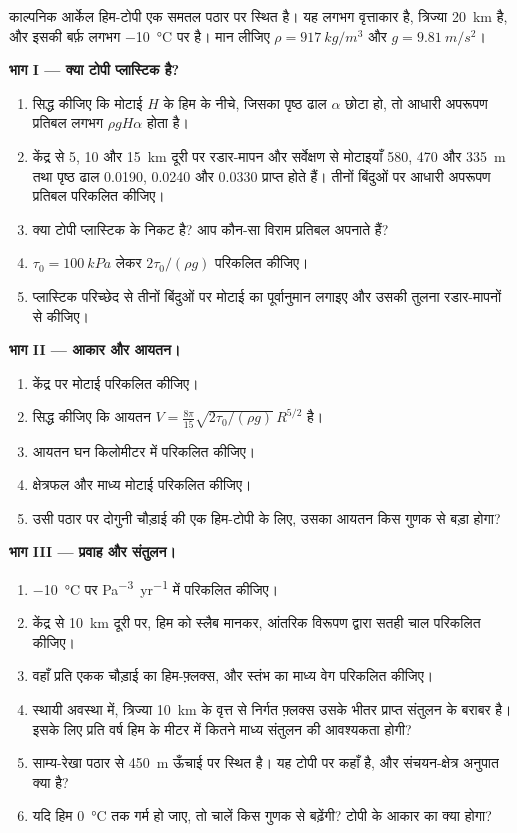 \begin{problem}[{सप्ताहांत समस्या --- आकार, प्रवाह, संतुलन और
काल्पनिक हिम-टोपी का समुद्र-तल तुल्यांक}]
\label{pb:b3:glaciology:1}
काल्पनिक आर्केल हिम-टोपी एक समतल पठार पर स्थित है। यह लगभग वृत्ताकार है,
त्रिज्या \qty{20}{km} है, और इसकी बर्फ़ लगभग \qty{-10}{\celsius} पर है। मान लीजिए
$\rho = \qty{917}{kg/m^3}$ और $g = \qty{9.81}{m/s^2}$।

\medskip\noindent\textbf{भाग I --- क्या टोपी प्लास्टिक है?}
\begin{enumerate}
\item सिद्ध कीजिए कि मोटाई $H$ के हिम के नीचे, जिसका पृष्ठ ढाल
  $\alpha$ छोटा हो, तो आधारी अपरूपण प्रतिबल लगभग $\rho gH\alpha$ होता है।
\item केंद्र से 5, 10 और \qty{15}{km} दूरी पर रडार-मापन और सर्वेक्षण
  से मोटाइयाँ 580, 470 और \qty{335}{m} तथा पृष्ठ ढाल
  \num{0.0190}, \num{0.0240} और \num{0.0330} प्राप्त होते हैं। तीनों बिंदुओं पर आधारी अपरूपण
  प्रतिबल परिकलित कीजिए।
\item क्या टोपी प्लास्टिक के निकट है? आप कौन-सा विराम प्रतिबल अपनाते हैं?
\item $\tau_0 = \qty{100}{kPa}$ लेकर $2\tau_0/(\rho g)$ परिकलित कीजिए।
\item प्लास्टिक परिच्छेद से तीनों बिंदुओं पर मोटाई का पूर्वानुमान लगाइए
  और उसकी तुलना रडार-मापनों से कीजिए।
\end{enumerate}

\medskip\noindent\textbf{भाग II --- आकार और आयतन।}
\begin{enumerate}[resume]
\item केंद्र पर मोटाई परिकलित कीजिए।
\item सिद्ध कीजिए कि आयतन $V = \frac{8\pi}{15}\sqrt{2\tau_0/(\rho
  g)}\,R^{5/2}$ है।
\item आयतन घन किलोमीटर में परिकलित कीजिए।
\item क्षेत्रफल और माध्य मोटाई परिकलित कीजिए।
\item उसी पठार पर दोगुनी चौड़ाई की एक हिम-टोपी के लिए, उसका आयतन किस गुणक से
  बड़ा होगा?
\end{enumerate}

\medskip\noindent\textbf{भाग III --- प्रवाह और संतुलन।}
\begin{enumerate}[resume]
\item \qty{-10}{\celsius} पर 
  \unit{Pa^{-3}.yr^{-1}} में परिकलित कीजिए।
\item केंद्र से \qty{10}{km} दूरी पर, हिम को स्लैब मानकर,
  आंतरिक विरूपण द्वारा सतही चाल परिकलित कीजिए।
\item वहाँ प्रति एकक चौड़ाई का हिम-फ़्लक्स, और
  स्तंभ का माध्य वेग परिकलित कीजिए।
\item स्थायी अवस्था में, त्रिज्या
  \qty{10}{km} के वृत्त से निर्गत फ़्लक्स उसके भीतर प्राप्त संतुलन के बराबर है। इसके लिए
  प्रति वर्ष हिम के मीटर में कितने माध्य संतुलन की आवश्यकता होगी?
\item साम्य-रेखा पठार से \qty{450}{m} ऊँचाई पर स्थित है। यह टोपी पर कहाँ है,
  और संचयन-क्षेत्र अनुपात क्या है?
\item यदि हिम \qty{0}{\celsius} तक गर्म हो जाए, तो चालें किस गुणक से
  बढ़ेंगी? टोपी के आकार का क्या होगा?
\end{enumerate}


\end{problem}
